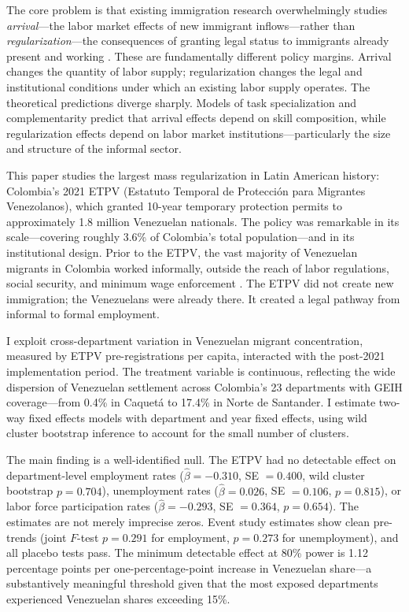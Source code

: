 \documentclass[12pt]{article}
\begin{document}
The core problem is that existing immigration research overwhelmingly studies \textit{arrival}---the labor market effects of new immigrant inflows---rather than \textit{regularization}---the consequences of granting legal status to immigrants already present and working \citep{borjas2003labor, card1990impact, dustmann2017labour}. These are fundamentally different policy margins. Arrival changes the quantity of labor supply; regularization changes the legal and institutional conditions under which an existing labor supply operates. The theoretical predictions diverge sharply. Models of task specialization \citep{peri2009task} and complementarity \citep{ottaviano2012rethinking} predict that arrival effects depend on skill composition, while regularization effects depend on labor market institutions---particularly the size and structure of the informal sector.

This paper studies the largest mass regularization in Latin American history: Colombia's 2021 ETPV (Estatuto Temporal de Protecci\'on para Migrantes Venezolanos), which granted 10-year temporary protection permits to approximately 1.8 million Venezuelan nationals. The policy was remarkable in its scale---covering roughly 3.6\% of Colombia's total population---and in its institutional design. Prior to the ETPV, the vast majority of Venezuelan migrants in Colombia worked informally, outside the reach of labor regulations, social security, and minimum wage enforcement \citep{ibanez2022life}. The ETPV did not create new immigration; the Venezuelans were already there. It created a legal pathway from informal to formal employment.

I exploit cross-department variation in Venezuelan migrant concentration, measured by ETPV pre-registrations per capita, interacted with the post-2021 implementation period. The treatment variable is continuous, reflecting the wide dispersion of Venezuelan settlement across Colombia's 23 departments with GEIH coverage---from 0.4\% in Caquet\'a to 17.4\% in Norte de Santander. I estimate two-way fixed effects models with department and year fixed effects, using wild cluster bootstrap inference \citep{cameron2008bootstrap} to account for the small number of clusters.

The main finding is a well-identified null. The ETPV had no detectable effect on department-level employment rates ($\hat{\beta} = -0.310$, SE $= 0.400$, wild cluster bootstrap $p = 0.704$), unemployment rates ($\hat{\beta} = 0.026$, SE $= 0.106$, $p = 0.815$), or labor force participation rates ($\hat{\beta} = -0.293$, SE $= 0.364$, $p = 0.654$). The estimates are not merely imprecise zeros. Event study estimates show clean pre-trends (joint $F$-test $p = 0.291$ for employment, $p = 0.273$ for unemployment), and all placebo tests pass. The minimum detectable effect at 80\% power is 1.12 percentage points per one-percentage-point increase in Venezuelan share---a substantively meaningful threshold given that the most exposed departments experienced Venezuelan shares exceeding 15\%.
\end{document}
